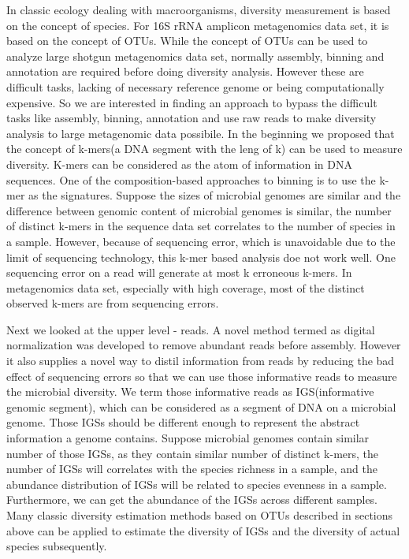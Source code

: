 \documentclass[12pt]{report}
\begin{document}
In classic ecology dealing with macroorganisms, diversity measurement is based 
on the concept of species. For 16S rRNA amplicon metagenomics data set, it is 
based on the concept of OTUs. While the concept of OTUs can be used to analyze
large shotgun metagenomics data set, normally assembly, binning and annotation
are required before doing diversity analysis. However these are difficult
tasks, lacking of necessary reference genome or being computationally
expensive. So we are interested in finding an approach to bypass the difficult
tasks like assembly, binning, annotation and use raw reads to make diversity
analysis to large metagenomic data possibile. In the beginning we proposed that
 the concept of k-mers(a DNA segment with the leng of k) can be used to measure
 diversity. K-mers can be considered as the atom of information in DNA 
sequences. One of the composition-based approaches to binning is to use the 
k-mer as the signatures. Suppose the sizes of microbial genomes are similar and
 the difference between genomic content of microbial genomes is similar, the 
number of distinct k-mers in the sequence data set correlates to the number of 
species in a sample. However, because of sequencing error, which is unavoidable
 due to the limit of sequencing technology, this k-mer based analysis doe not 
work well. One sequencing error on a read will generate at most k erroneous 
k-mers. In metagenomics data set, especially with high coverage, most of the 
distinct observed k-mers are from sequencing errors.

Next we looked at the upper level - reads. A novel method termed as digital 
normalization was developed to remove abundant reads before assembly. However 
it also supplies a novel way to distil information from reads by reducing the
 bad effect of sequencing errors so that we can use those informative reads to 
measure the microbial diversity. We term those informative reads as 
IGS(informative genomic segment), which can be considered as a segment of DNA 
on a microbial genome. Those IGSs should be different enough to represent the 
abstract information a genome contains. Suppose microbial genomes contain 
similar number of those IGSs, as they contain similar number of distinct 
k-mers, the number of IGSs will correlates with the species richness in a 
sample, and the abundance distribution of IGSs will be related to species 
evenness in a sample. Furthermore, we can get the abundance of the IGSs across
different samples. Many classic diversity estimation methods based on OTUs 
 described in sections above can be applied to estimate the diversity of IGSs 
and the diversity of actual species subsequently.
\end{document}
